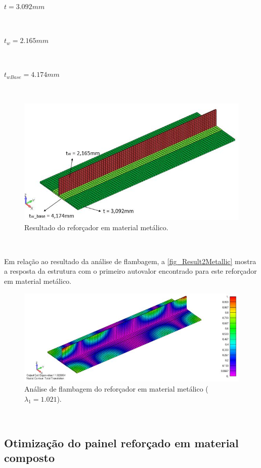 \centerline{$t = 3.092 mm$}\

\centerline{$t_w = 2.165 mm$}\

\centerline{$t_{wBase} = 4.174 mm$}\

\begin{figure}[ht]
 \caption{\label{fig_Result1Metallic}Resultado do reforçador em material metálico.}
 \centering
 \includegraphics[scale=0.85]{figura/Results_Metallic}
\end{figure}
\

Em relação ao resultado da análise de flambagem, a \autoref{fig_Result2Metallic} mostra a resposta da estrutura com o primeiro autovalor encontrado para este reforçador em material metálico.

\begin{figure}[ht]
 \caption{\label{fig_Result2Metallic}Análise de flambagem do reforçador em material metálico ($\lambda_1 = 1.021$).}
 \centering
 \includegraphics[scale=0.85]{figura/Results2_Metallic}
\end{figure}
\

\subsection{Otimização do painel reforçado em material composto}

